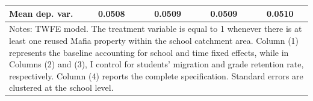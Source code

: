 \documentclass[12pt]{article}
\theoremstyle{plain}
\theoremstyle{plain}
\theoremstyle{plain}
\theoremstyle{definition}
\theoremstyle{plain}
\theoremstyle{definition}
\theoremstyle{plain}
\theoremstyle{remark}
\theoremstyle{definition}
\theoremstyle{definition}
\theoremstyle{plain}
\begin{document}
\begin{table}[H]
{\begin{tabular}{p{12.39em}llll}
			\multicolumn{1}{l}{Mean dep. var.} & \multicolumn{1}{c}{0.0508} & \multicolumn{1}{c}{0.0509} & \multicolumn{1}{c}{0.0509} & \multicolumn{1}{c}{0.0510} \\
			\midrule
			\multicolumn{5}{p{36.39em}}{Notes: TWFE model. The treatment variable is equal to 1 whenever there is at least one reused Mafia property within the
				school catchment area. Column (1) represents the baseline accounting for school and time fixed effects, while in Columns (2) and (3), I control for students’ migration and grade retention rate, respectively. Column (4) reports the complete specification. Standard errors are clustered at the school level.} \\
		\end{tabular}%
	}
\end{table}



\FloatBarrier
\end{document}

